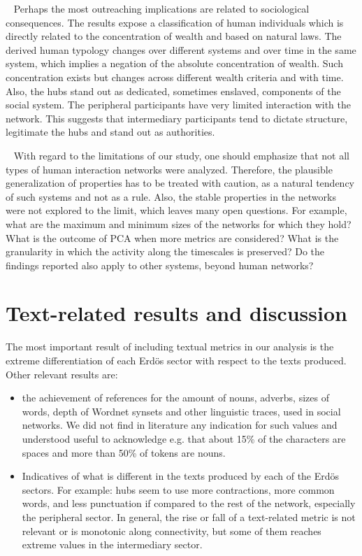  
Perhaps the most outreaching implications are related to sociological consequences. The results expose a classification of human individuals which is directly related to the concentration of wealth and based on natural laws. The derived human typology changes over different systems and over time in the same system, which implies a negation of the absolute concentration of wealth. Such concentration exists but changes across different wealth criteria and with time. Also, the hubs stand out as dedicated, sometimes enslaved,
components of the social system. The peripheral participants have very limited interaction with the network. This suggests that intermediary participants tend to dictate structure, legitimate the hubs and stand out as authorities.

 
With regard to the limitations of our study, one should emphasize that not all types of human interaction networks were analyzed. Therefore, the plausible generalization of properties has to be treated with caution, as a natural tendency of such systems and not as a rule. Also, the stable properties in the networks were not explored to the limit, which leaves many open questions. For example, what are the maximum and minimum sizes of the networks for which they hold? What is the outcome of PCA when more metrics are considered? What is the granularity in which the activity along the timescales is preserved? Do the findings reported also apply to other systems, beyond human networks?
 
\section{Text-related results and discussion}\label{sec:tresults}

The most important result of including textual metrics in our analysis is the
extreme differentiation of each Erd\"os sector with respect to the texts produced.
Other relevant results are:
\begin{itemize}
	\item the achievement of references for the amount of nouns, adverbs, sizes of words, depth of Wordnet synsets and other linguistic traces, used in social networks.
		We did not find in literature any indication for such values and understood useful to acknowledge e.g. that about 15\% of the characters are spaces and more than 50\% of tokens are nouns.
	\item Indicatives of what is different in the texts produced by each of the Erd\"os sectors.
		For example: hubs seem to use more contractions,
		more common words, and less punctuation if compared to the rest of the network,
		especially the peripheral sector.
		In general, the rise or fall of a text-related metric is not relevant or is monotonic along connectivity,
		but some of them reaches extreme values in the intermediary sector.
\end{itemize}

